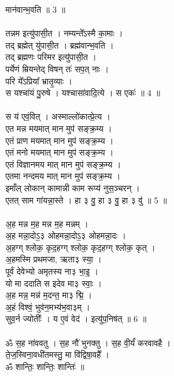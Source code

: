 मान॑वान्भ॒वति ॥ 3 ॥\\
\\
तन्नम इत्यु॑पासी॒त । नम्यन्ते᳚ऽस्मै का॒माः ।\\
तद् ब्रह्मेत् यु॑पासी॒त । ब्रह्म॑वान्भ॒वति ।\\
तद् ब्रह्मणः परिमर इत्यु॑पासी॒त ।\\
पर्येणं म्रियन्तेद् विषन् तः॑ सप॒त् नाः ।\\
परि ये᳚ऽप्रिया᳚ भ्रातृ॒व्याः ।\\
स यश्चा॑यं पु॒रुषे । यश्चासा॑वादि॒त्ये । स एकः॑ ॥ 4 ॥\\
\\
स य॑ एवं॒वित् । अस्माल्लो॑कात्प्रे॒त्य ।\\
एत मन्न मयमात् मान मुप॑ सङ्क्र॒म्य ।\\
एतं प्राण मयमात् मान मुप॑ सङ्क्र॒म्य ।\\
एतं मनो मयमात् मान मुप॑ सङ्क्र॒म्य ।\\
एतं विज्ञानमय मात् मान मुप॑ सङ्क्र॒म्य ।\\
एतमा नन्दमय मात् मान मुप॑ सङ्क्र॒म्य ।\\
इमाँल् लोकान् कामान्नी काम रूप्य॑ नुस॒ञ्चरन् ।\\
एतत् साम गा॑यन्ना॒स्ते । हा ३ वु॒ हा ३ वु॒ हा ३ वु॑ ॥ 5 ॥\\
\\
अ॒ह मन्न म॒ह मन्न म॒ह मन्नम् ।\\
अ॒ह मन्ना॒दोऽ॒३ ओहमन्ना॒दोऽ॒३ ओहमन्ना॒दः ।\\
अ॒हग्ग् श्लोक॒ कृद॒हग्ग् श्लोक॒ कृद॒हग्ग् श्लोक॒ कृत् ।\\
अ॒हमस्मि प्रथमजा, ऋता३ स्या॒ ।\\
पूर्वं देवेभ्यो अमृतस्य ना३ भा॒इ॒ ।\\
यो मा ददाति स इदेव मा३ स्वाः॒ ।\\
अ॒ह मन्न॒ मन्न॑ म॒दन्त॒ मा३ द्मि॒ ।\\
अ॒हं विश्वं॒ भुव॑न॒मभ्य॑भ॒वा३म् ।\\
सुव॒र्न ज्योतीः᳚ । य ए॒वं वेद॑ । इत्यु॑प॒निष॑त् ॥ 6 ॥\\
\\
ॐ स॒ह ना॑ववतु । स॒ह नौ॑ भुनक्तु । स॒ह वी॒र्यं॑ करवावहै ।\\
ते॒ज॒स्विना॒वधी॑तमस्तु॒ मा वि॑द्विषा॒वहै᳚ ।\\
ॐ शान्तिः॒ शान्तिः॒ शान्तिः॑ ॥\\
